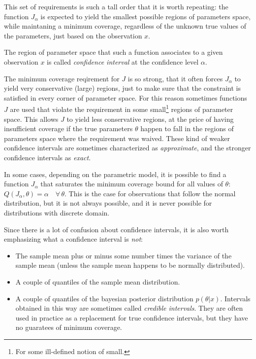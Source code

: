 \documentclass[11pt]{article}
\begin{document}
This set of requirements is such a tall order that it is worth repeating: the
function $J_\alpha$ is expected to yield the smallest possible regions of
parameters space, while maintaning a minimum coverage, regardless of the
unknown true values of the parameters, just based on the observation $x$.

The region of parameter space that such a function associates to a given
observation $x$ is called \emph{confidence interval} at the confidence level
$\alpha$.

The minimum coverage reqirement for $J$ is so strong, that it often forces
$J_\alpha$ to yield very conservative (large) regions, just to make sure that
the constraint is satisfied in every corner of parameter space. For this reason
sometimes functions $J$ are used that violate the requirement in some
small\footnote{For some ill-defined notion of small.} regions of parameter
space. This allows $J$ to yield less conservative regions, at the price of
having insufficient coverage if the true parameters $\theta$ happen to fall in
the regions of parameters space where the requirement was waived. These kind of
weaker confidence intervals are sometimes characterized as \emph{approximate},
and the stronger confidence intervals as \emph{exact}.

In some cases, depending on the parametric model, it is possible to find a
function $J_\alpha$ that saturates the minimum coverage bound for all values of
$\theta$: $Q(J_\alpha, \theta) = \alpha\quad \forall\, \theta$. This is the
case for observations that follow the normal distribution, but it is not always
possible, and it is never possible for distributions with discrete domain.

Since there is a lot of confusion about confidence intervals, it is also worth
emphasizing what a confidence interval is \emph{not}:

\begin{itemize}

\item The sample mean plus or minus some number times the variance of the
    sample mean (unless the sample mean happens to be normally distributed).

\item A couple of quantiles of the sample mean distribution.

\item A couple of quantiles of the bayesian posterior distribution
    $p(\theta|x)$. Intervals obtained in this way are sometimes called
    \emph{credible intervals}. They are often used in practice as a replacement
    for true confidence intervals, but they have no guaratees of minimum
    coverage.
\end{itemize}
\end{document}

